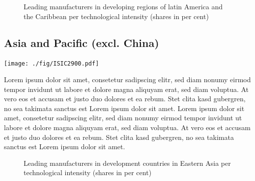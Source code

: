 \documentclass[
  openany, nofonts]{tufte-book}
\begin{document}
\vspace*{\fill}

\begin{figure}
\newline{}\caption[Leading manufacturers in developing regions of latin America and the Caribbean per technological intensity (shares in per cent)]{Leading manufacturers in developing regions of latin America and the Caribbean per technological intensity (shares in per cent)}\label{fig:c05-indshareDEVsub2slope}
\end{figure}

\clearpage\pagebreak

\hypertarget{asia-and-pacific-excl.-china}{%
\subsection{Asia and Pacific (excl. China)}\label{asia-and-pacific-excl.-china}}

\begin{marginfigure}
\texttt{[image: ./fig/ISIC2900.pdf]} \end{marginfigure}

Lorem ipsum dolor sit amet, consetetur sadipscing elitr, sed diam nonumy eirmod tempor invidunt ut labore et dolore magna aliquyam erat, sed diam voluptua. At vero eos et accusam et justo duo dolores et ea rebum. Stet clita kasd gubergren, no sea takimata sanctus est Lorem ipsum dolor sit amet. Lorem ipsum dolor sit amet, consetetur sadipscing elitr, sed diam nonumy eirmod tempor invidunt ut labore et dolore magna aliquyam erat, sed diam voluptua. At vero eos et accusam et justo duo dolores et ea rebum. Stet clita kasd gubergren, no sea takimata sanctus est Lorem ipsum dolor sit amet.

\vspace*{\fill}

\begin{figure}
\newline{}\caption[Leading manufacturers in development countries in Eastern Asia per technological intensity (shares in per cent)]{Leading manufacturers in development countries in Eastern Asia per technological intensity (shares in per cent)}\label{fig:c05-indshareDEVsub3slope}
\end{figure}
\end{document}
